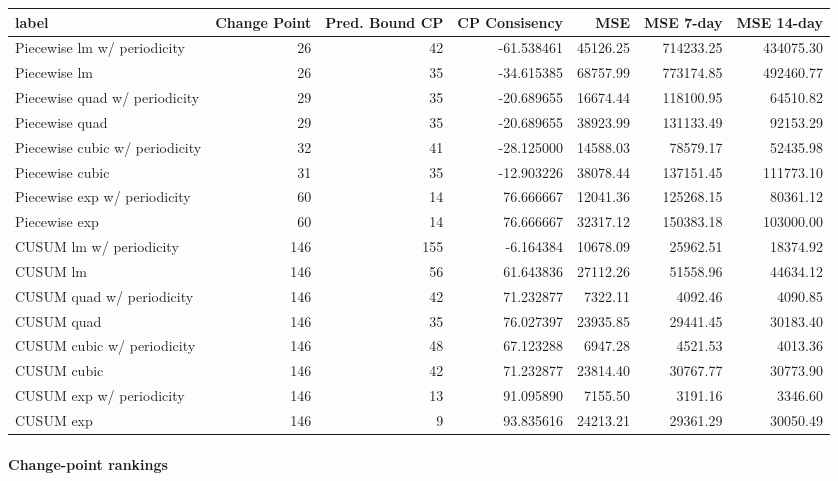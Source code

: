 \documentclass[
]{article}
\begin{document}
\begin{table}
\centering
\begin{tabular}{l|r|r|r|r|r|r}
\hline
label & Change Point & Pred. Bound CP & CP Consisency & MSE & MSE 7-day & MSE 14-day\\
\hline
Piecewise lm w/ periodicity & 26 & 42 & -61.538461 & 45126.25 & 714233.25 & 434075.30\\
\hline
Piecewise lm & 26 & 35 & -34.615385 & 68757.99 & 773174.85 & 492460.77\\
\hline
Piecewise quad w/ periodicity & 29 & 35 & -20.689655 & 16674.44 & 118100.95 & 64510.82\\
\hline
Piecewise quad & 29 & 35 & -20.689655 & 38923.99 & 131133.49 & 92153.29\\
\hline
Piecewise cubic w/ periodicity & 32 & 41 & -28.125000 & 14588.03 & 78579.17 & 52435.98\\
\hline
Piecewise cubic & 31 & 35 & -12.903226 & 38078.44 & 137151.45 & 111773.10\\
\hline
Piecewise exp w/ periodicity & 60 & 14 & 76.666667 & 12041.36 & 125268.15 & 80361.12\\
\hline
Piecewise exp & 60 & 14 & 76.666667 & 32317.12 & 150383.18 & 103000.00\\
\hline
CUSUM lm w/ periodicity & 146 & 155 & -6.164384 & 10678.09 & 25962.51 & 18374.92\\
\hline
CUSUM lm & 146 & 56 & 61.643836 & 27112.26 & 51558.96 & 44634.12\\
\hline
CUSUM quad w/ periodicity & 146 & 42 & 71.232877 & 7322.11 & 4092.46 & 4090.85\\
\hline
CUSUM quad & 146 & 35 & 76.027397 & 23935.85 & 29441.45 & 30183.40\\
\hline
CUSUM cubic w/ periodicity & 146 & 48 & 67.123288 & 6947.28 & 4521.53 & 4013.36\\
\hline
CUSUM cubic & 146 & 42 & 71.232877 & 23814.40 & 30767.77 & 30773.90\\
\hline
CUSUM exp w/ periodicity & 146 & 13 & 91.095890 & 7155.50 & 3191.16 & 3346.60\\
\hline
CUSUM exp & 146 & 9 & 93.835616 & 24213.21 & 29361.29 & 30050.49\\
\hline
\end{tabular}
\end{table}

\hypertarget{change-point-rankings-1}{%
\paragraph{Change-point rankings}\label{change-point-rankings-1}}
\end{document}
